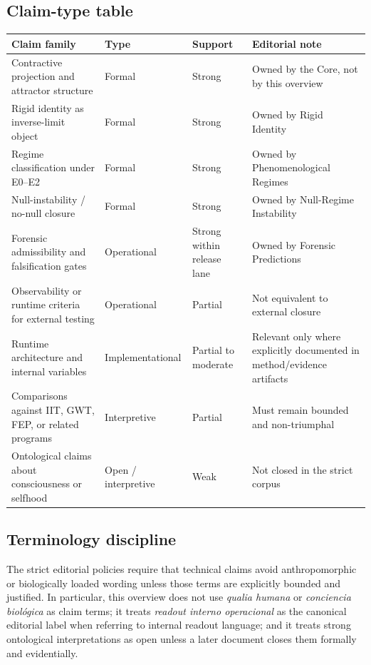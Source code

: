 \documentclass[11pt,a4paper]{article}
\begin{document}
\subsection{Claim-type table}

\begin{longtable}{p{} p{} p{} p{}}
\toprule
\textbf{Claim family} & \textbf{Type} & \textbf{Support} & \textbf{Editorial note} \\
\midrule
\endhead
Contractive projection and attractor structure & Formal & Strong & Owned by the Core, not by this overview \\
Rigid identity as inverse-limit object & Formal & Strong & Owned by Rigid Identity \\
Regime classification under E0--E2 & Formal & Strong & Owned by Phenomenological Regimes \\
Null-instability / no-null closure & Formal & Strong & Owned by Null-Regime Instability \\
Forensic admissibility and falsification gates & Operational & Strong within release lane & Owned by Forensic Predictions \\
Observability or runtime criteria for external testing & Operational & Partial & Not equivalent to external closure \\
Runtime architecture and internal variables & Implementational & Partial to moderate & Relevant only where explicitly documented in method/evidence artifacts \\
Comparisons against IIT, GWT, FEP, or related programs & Interpretive & Partial & Must remain bounded and non-triumphal \\
Ontological claims about consciousness or selfhood & Open / interpretive & Weak & Not closed in the strict corpus \\
\bottomrule
\end{longtable}

\subsection{Terminology discipline}

The strict editorial policies require that technical claims avoid anthropomorphic or biologically loaded wording unless those terms are explicitly bounded and justified. In particular, this overview does not use \emph{qualia humana} or \emph{conciencia biológica} as claim terms; it treats \emph{readout interno operacional} as the canonical editorial label when referring to internal readout language; and it treats strong ontological interpretations as open unless a later document closes them formally and evidentially.
\end{document}
